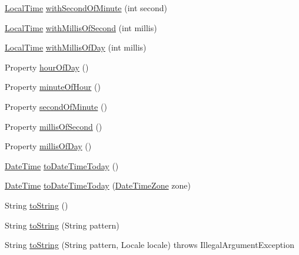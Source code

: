 \begin{DoxyCompactItemize}
\item 
\hyperlink{classorg_1_1joda_1_1time_1_1_local_time}{Local\-Time} \hyperlink{classorg_1_1joda_1_1time_1_1_local_time_a9e8f34fba519c0708ff597e93d59469e}{with\-Second\-Of\-Minute} (int second)
\item 
\hyperlink{classorg_1_1joda_1_1time_1_1_local_time}{Local\-Time} \hyperlink{classorg_1_1joda_1_1time_1_1_local_time_a399a3ad07fc471c13178bebd3b58b298}{with\-Millis\-Of\-Second} (int millis)
\item 
\hyperlink{classorg_1_1joda_1_1time_1_1_local_time}{Local\-Time} \hyperlink{classorg_1_1joda_1_1time_1_1_local_time_ac962fe5d98d67bc5b2b178f21405e5f6}{with\-Millis\-Of\-Day} (int millis)
\item 
Property \hyperlink{classorg_1_1joda_1_1time_1_1_local_time_a61533ce76db2296ae3217e1accb06397}{hour\-Of\-Day} ()
\item 
Property \hyperlink{classorg_1_1joda_1_1time_1_1_local_time_a63d30bc94f90913864d8a0b1481d65a7}{minute\-Of\-Hour} ()
\item 
Property \hyperlink{classorg_1_1joda_1_1time_1_1_local_time_a6b79349556e7a87b3ca25576aab58f42}{second\-Of\-Minute} ()
\item 
Property \hyperlink{classorg_1_1joda_1_1time_1_1_local_time_a97da4c8bd786b720a66073104d14638f}{millis\-Of\-Second} ()
\item 
Property \hyperlink{classorg_1_1joda_1_1time_1_1_local_time_a588bf52cfc5bb6f8572484819ac62456}{millis\-Of\-Day} ()
\item 
\hyperlink{classorg_1_1joda_1_1time_1_1_date_time}{Date\-Time} \hyperlink{classorg_1_1joda_1_1time_1_1_local_time_ab03df209afb2f48dbf34346ea58a6c62}{to\-Date\-Time\-Today} ()
\item 
\hyperlink{classorg_1_1joda_1_1time_1_1_date_time}{Date\-Time} \hyperlink{classorg_1_1joda_1_1time_1_1_local_time_a4090444be15bbabacc07ebed756ea35f}{to\-Date\-Time\-Today} (\hyperlink{classorg_1_1joda_1_1time_1_1_date_time_zone}{Date\-Time\-Zone} zone)
\item 
String \hyperlink{classorg_1_1joda_1_1time_1_1_local_time_a23da20882cf272ccb263328c18461b6c}{to\-String} ()
\item 
String \hyperlink{classorg_1_1joda_1_1time_1_1_local_time_a738cc5a775172fdbdef4a8163268258e}{to\-String} (String pattern)
\item 
String \hyperlink{classorg_1_1joda_1_1time_1_1_local_time_aafe03e6c0394f3bf07cff16df885989e}{to\-String} (String pattern, Locale locale)  throws Illegal\-Argument\-Exception 
\end{DoxyCompactItemize}
